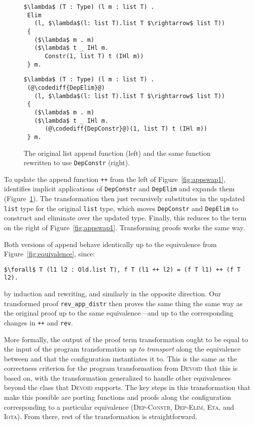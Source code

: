 \begin{figure}
\begin{minipage}{0.48\textwidth}
\begin{lstlisting}
$\lambda$ (T : Type) (l m : list T) .
 Elim
   (l, $\lambda$(l: list T).list T $\rightarrow$ list T))
 {
   ($\lambda$ m . m)
   ($\lambda$ t _ IHl m.
      Constr(1, list T) t (IHl m))
 } m.
\end{lstlisting}
\end{minipage}
\hfill
\begin{minipage}{0.48\textwidth}
\begin{lstlisting}
$\lambda$ (T : Type) (l m : list T) .
 (@\codediff{DepElim}@)
   (l, $\lambda$(l: list T).list T $\rightarrow$ list T))
 {
   ($\lambda$ m . m)
   ($\lambda$ t _ IHl m.
      (@\codediff{DepConstr}@)(1, list T) t (IHl m))
 } m.
\end{lstlisting}
\end{minipage}
\caption{The original list append function (left) and the same function rewritten to use \lstinline{DepConstr} (right).}
\label{fig:appswap2}
\end{figure}

To update the append function \lstinline{++} from the left of Figure~\ref{fig:appswap1}, \toolname
identifies implicit applications of \lstinline{DepConstr} and \lstinline{DepElim} and expands them (Figure~\ref{fig:appswap2}).
The transformation then just recursively substitutes in the updated \lstinline{list} type
for the original \lstinline{list} type, which moves \lstinline{DepConstr} and \lstinline{DepElim}
to construct and eliminate over the updated type.
Finally, this reduces to the term on the right of Figure~\ref{fig:appswap1}.
Transforming proofs works the same way.

Both versions of append behave identically up to the equivalence from Figure~\ref{fig:equivalence}, since:

\begin{lstlisting}
$\forall$ T (l1 l2 : Old.list T), f T (l1 ++ l2) = (f T l1) ++ (f T l2).
\end{lstlisting}
by induction and rewriting, and similarly in the opposite direction.
Our transformed proof \lstinline{rev_app_distr} then proves the same thing the same way
as the original proof up to the same equivalence---and up to the corresponding changes in \lstinline{++}
and \lstinline{rev}.

More formally, the output of the proof term transformation ought to be equal to the input of the program transformation
\textit{up to transport} along the equivalence between \A and \B that the configuration instantiates it to.
This is the same as the correctness criterion for the program transformation from \textsc{Devoid} that this is based on,
with the transformation generalized to handle other equivalences beyond the class that \textsc{Devoid} supports.
The key steps in this transformation that make this possible are porting functions and proofs along the configuration corresponding
to a particular equivalence (\textsc{Dep-Constr}, \textsc{Dep-Elim}, \textsc{Eta}, and \textsc{Iota}).
From there, rest of the transformation is straightforward.

